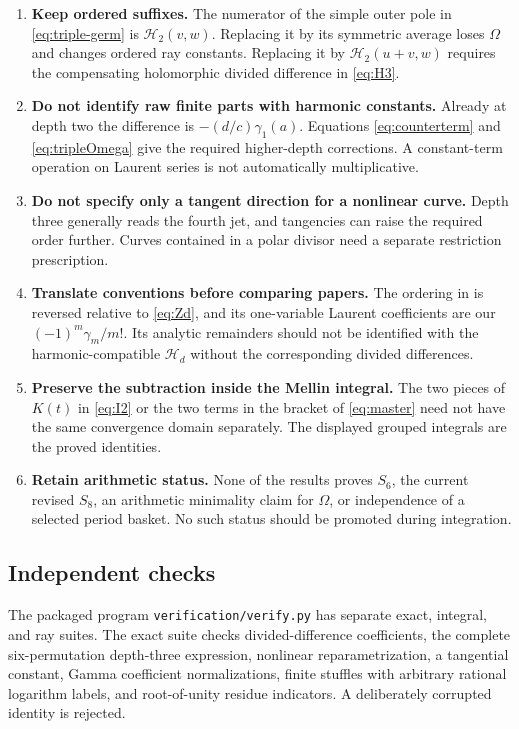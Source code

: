 \documentclass[11pt,a4paper]{article}
\numberwithin{equation}{section}
\theoremstyle{definition}\newtheorem{definition}[theorem]{Definition}
\theoremstyle{remark}\newtheorem{remark}[theorem]{Remark}
\newcommand{\HH}{\mathcal H}
\newcommand{\src}[1]{{\small\nolinkurl{#1}}}
\begin{document}
\begin{enumerate}[itemsep=5pt]
\item \textbf{Keep ordered suffixes.} The numerator of the simple outer
pole in \eqref{eq:triple-germ} is $\HH_2(v,w)$.
Replacing it by its symmetric average loses $\Omega$ and changes ordered
ray constants. Replacing it by $\HH_2(u+v,w)$ requires the compensating
holomorphic divided difference in \eqref{eq:H3}.
\item \textbf{Do not identify raw finite parts with harmonic constants.}
Already at depth two the difference is $-(d/c)\gamma_1(a)$. Equations
\eqref{eq:counterterm} and \eqref{eq:tripleOmega} give the required
higher-depth corrections. A constant-term operation on Laurent series
is not automatically multiplicative.
\item \textbf{Do not specify only a tangent direction for a nonlinear
curve.} Depth three generally reads the fourth jet, and tangencies can
raise the required order further. Curves contained in a polar divisor
need a separate restriction prescription.
\item \textbf{Translate conventions before comparing papers.}
The ordering in \cite{mow} is reversed relative to \eqref{eq:Zd}, and
its one-variable Laurent coefficients are our
$(-1)^m\gamma_m/m!$. Its analytic remainders should not be identified
with the harmonic-compatible $\HH_d$ without the corresponding divided
differences.
\item \textbf{Preserve the subtraction inside the Mellin integral.}
The two pieces of $K(t)$ in \eqref{eq:I2} or the two terms in the
bracket of \eqref{eq:master} need not have the same convergence domain
separately. The displayed grouped integrals are the proved identities.
\item \textbf{Retain arithmetic status.} None of the results proves
$S_6$, the current revised $S_8$, an arithmetic minimality claim for
$\Omega$, or independence of a selected period basket. No such status
should be promoted during integration.
\end{enumerate}

\subsection{Independent checks}
The packaged program \src{verification/verify.py} has separate exact,
integral, and ray suites. The exact suite checks divided-difference
coefficients, the complete six-permutation depth-three expression,
nonlinear reparametrization, a tangential constant, Gamma coefficient
normalizations, finite stuffles with arbitrary rational logarithm labels,
and root-of-unity residue indicators. A deliberately corrupted identity
is rejected.
\end{document}
